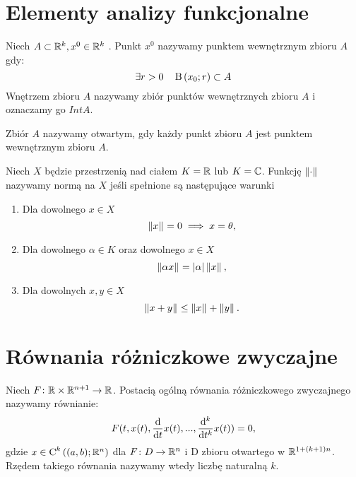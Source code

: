 \documentclass[12pt,a4paper]{report}
\begin{document}
\section{Elementy analizy funkcjonalne}

\begin{definition} 
Niech $A \subset \setR^k, x^0 \in \setR^k$ . Punkt $x^0$ nazywamy punktem wewnętrznym zbioru $A$ gdy:
$$
\exists  r>0 \quad   \ball{x_0}{r} \subset A
$$
Wnętrzem zbioru $A$ nazywamy zbiór punktów wewnętrznych zbioru $A$ i oznaczamy go $IntA$.
\end{definition}

\begin{definition}  
Zbiór $A$ nazywamy otwartym, gdy każdy punkt zbioru $A$ jest punktem wewnętrznym zbioru $A$. 
\end{definition}

\begin{definition} [Norma]
Niech $X$ będzie przestrzenią nad ciałem $K =\setR $ lub $ K = \setC $. Funkcję $\norm{\cdot}$ nazywamy normą na $X$ jeśli spełnione są następujące warunki 
\begin{enumerate}
\item Dla dowolnego $x\in X$
$$
 \norm{x} = 0 \implies x = \theta,
$$
\item Dla dowolnego $\alpha \in K$ oraz dowolnego $x \in X$ 
$$
\norm{\alpha x}  = \abs{\alpha}  \norm{x},
$$
\item Dla dowolnych $x,y\in X$
$$
 \norm{x+y} \leq \norm{x} + \norm{y}.
$$
\end{enumerate}

\end{definition}

\section{Równania różniczkowe zwyczajne}

\begin{definition} 
Niech $F \colon \setR \times \setR^{n+1} \to \setR$. Postacią ogólną równania różniczkowego zwyczajnego nazywamy równianie: 
\begin{equation*}
F(t, x(t), \ddx{t} x(t),..., \ddx[^k]{t^k} x(t) ) = 0,
\end{equation*}
gdzie $x \in \Ck{k}{(a,b); \setR^n}$ dla $F \colon D \to \setR^n$ i D zbioru otwartego w $\setR^{1+(k+1)n}$. 
Rzędem takiego równania nazywamy wtedy liczbę naturalną $k$. 
\end{definition}
\end{document}
